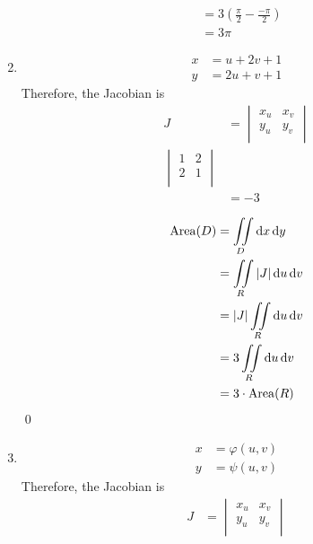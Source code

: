 \documentclass[fleqn, a4paper, 11pt, oneside]{amsart}
\theoremstyle{definition}
\theoremstyle{theorem}
\begin{document}
\begin{solution}
\begin{enumerate}[leftmargin = *]
\begin{align*}
                                                               & = 3 \left( \frac{\pi}{2} - \frac{-\pi}{2} \right)                                                     \\
                                                               & = 3 \pi
			\end{align*}
		\item
			\begin{align*}
				x & = u + 2 v + 1 \\
				y & = 2 u + v + 1
			\end{align*}
			Therefore, the Jacobian is
			\begin{align*}
				J &=
					\begin{vmatrix}
						x_u & x_v \\
						y_u & y_v \\
					\end{vmatrix}\\
					\begin{vmatrix}
						1 & 2 \\
						2 & 1 \\
					\end{vmatrix}\\
				&= -3\\
			\end{align*}
			\begin{align*}
				\mathrm{Area}(D) & = \iint\limits_{D} \dif x \dif y     \\
                                                 & = \iint\limits_{R} |J| \dif u \dif v \\
                                                 & = |J| \iint\limits_{R} \dif u \dif v \\
                                                 & = 3 \iint\limits_{R} \dif u \dif v   \\
                                                 & = 3 \cdot \mathrm{Area}(R)
			\end{align*}
			\qed
		\item
			\begin{align*}
				x & = \varphi(u,v) \\
				y & = \psi(u,v)
			\end{align*}
			Therefore, the Jacobian is
			\begin{align*}
				J &=
					\begin{vmatrix}
						x_u & x_v \\
						y_u & y_v \\
					\end{vmatrix}\\

\end{align*}
\end{enumerate}
\end{solution}
\end{document}
